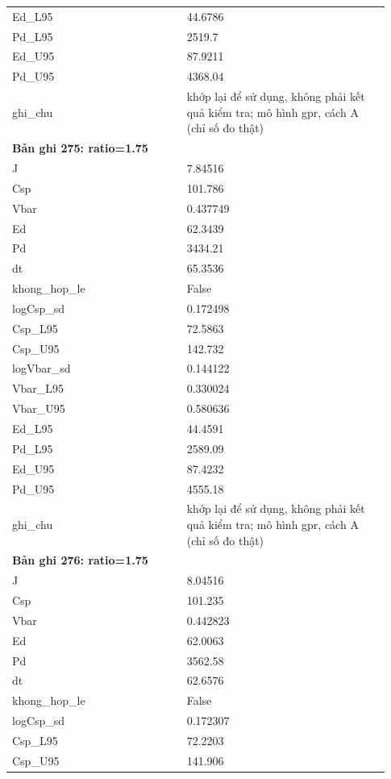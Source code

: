 \begin{longtable}{p{0.43\linewidth}p{0.50\linewidth}}
Ed\_\allowbreak L95 & 44.6786 \\
Pd\_\allowbreak L95 & 2519.7 \\
Ed\_\allowbreak U95 & 87.9211 \\
Pd\_\allowbreak U95 & 4368.04 \\
ghi\_\allowbreak chu & khớp lại để sử dụng, không phải kết quả kiểm tra; mô hình gpr, cách A (chỉ số đo thật) \\
\midrule
\multicolumn{2}{p{0.95\linewidth}}{\textbf{Bản ghi 275: ratio=1.75}} \\
J & 7.84516 \\
Csp & 101.786 \\
Vbar & 0.437749 \\
Ed & 62.3439 \\
Pd & 3434.21 \\
dt & 65.3536 \\
khong\_\allowbreak hop\_\allowbreak le & False \\
logCsp\_\allowbreak sd & 0.172498 \\
Csp\_\allowbreak L95 & 72.5863 \\
Csp\_\allowbreak U95 & 142.732 \\
logVbar\_\allowbreak sd & 0.144122 \\
Vbar\_\allowbreak L95 & 0.330024 \\
Vbar\_\allowbreak U95 & 0.580636 \\
Ed\_\allowbreak L95 & 44.4591 \\
Pd\_\allowbreak L95 & 2589.09 \\
Ed\_\allowbreak U95 & 87.4232 \\
Pd\_\allowbreak U95 & 4555.18 \\
ghi\_\allowbreak chu & khớp lại để sử dụng, không phải kết quả kiểm tra; mô hình gpr, cách A (chỉ số đo thật) \\
\midrule
\multicolumn{2}{p{0.95\linewidth}}{\textbf{Bản ghi 276: ratio=1.75}} \\
J & 8.04516 \\
Csp & 101.235 \\
Vbar & 0.442823 \\
Ed & 62.0063 \\
Pd & 3562.58 \\
dt & 62.6576 \\
khong\_\allowbreak hop\_\allowbreak le & False \\
logCsp\_\allowbreak sd & 0.172307 \\
Csp\_\allowbreak L95 & 72.2203 \\
Csp\_\allowbreak U95 & 141.906 \\

\end{longtable}
